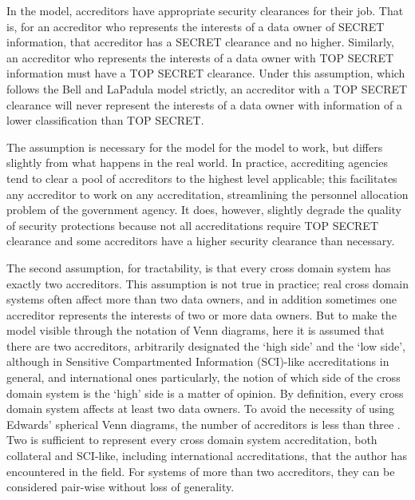 \documentclass[10pt,letterpaper,conference]{IEEEtran}
\begin{document}
In the model, accreditors have appropriate security clearances for their job.  That is, for an
accreditor who represents the interests of a data owner of SECRET information, that accreditor has
a SECRET clearance and no higher.  Similarly, an accreditor who represents the interests of a data
owner with TOP SECRET information must have a TOP SECRET clearance.  Under this assumption, which
follows the Bell and LaPadula model strictly, an accreditor with a TOP SECRET clearance will never
represent the interests of a data owner with information of a lower classification than TOP SECRET.

The assumption is necessary for the model for the model to work, but differs slightly from what
happens in the real
world.  In practice, accrediting agencies tend to clear a pool of accreditors to the highest
level applicable; this facilitates any accreditor to work on any accreditation, streamlining the
personnel allocation problem of the government agency.  It does, however, slightly degrade the
quality of security protections because not all accreditations require TOP SECRET clearance and
some accreditors have a higher security clearance than necessary.

The second assumption, for tractability, is that every cross domain system has exactly two
accreditors.  This assumption is not true in practice; real cross domain systems often affect
more than two
data owners, and in addition sometimes one accreditor represents the interests of two or more data
owners.  But to make the model visible through the notation of Venn diagrams, here it is assumed
that there are two accreditors, arbitrarily designated the `high side' and the `low side', although
in Sensitive Compartmented Information (SCI)-like accreditations in general, and international ones
particularly, the notion of which side of the cross domain system is the `high' side is a matter
of opinion.  By definition, every cross domain system affects at least two data owners.  To avoid
the necessity of using Edwards' spherical Venn diagrams, the number of accreditors is less than
three \cite{Edwards2004}.  Two is sufficient to represent every cross domain system accreditation,
both collateral and SCI-like, including international accreditations, that the author has
encountered in the field.  For systems of more than two accreditors, they can be considered
pair-wise without loss of generality.
\end{document}
